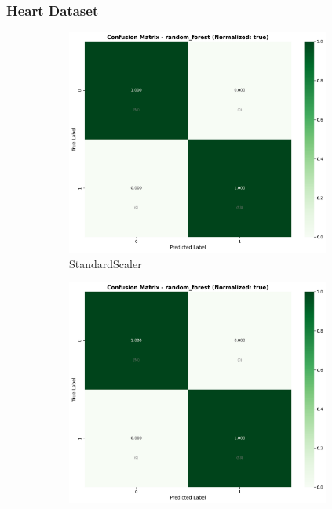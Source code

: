\FloatBarrier

\subsubsection{Heart Dataset}\label{subsubsec:rf-heart}

\begin{figure}[H]
\centering
\begin{subfigure}[b]{0.31\textwidth}
\centering
\includegraphics[width=0.95\textwidth]{Result/heart_dataset/confusion_matrices/random_forest_numeric_dataset_StandardScaler.png}
\caption{StandardScaler}
\label{fig:rf_heart_cm_standard}
\end{subfigure}\hfill
\begin{subfigure}[b]{0.31\textwidth}
\centering
\includegraphics[width=0.95\textwidth]{Result/heart_dataset/confusion_matrices/random_forest_numeric_dataset_MinMaxScaler.png}

\end{subfigure}
\end{figure}
